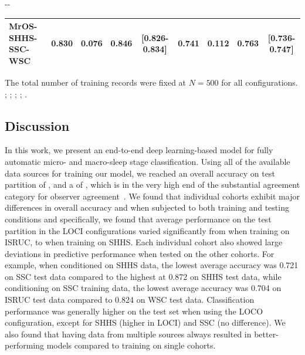 \begin{table}[p]
\begin{adjustwidth*}{}{-\marginparwidth-\marginparsep}
\begin{threeparttable}
\begin{tabular}{@{}lcccccccc@{}}
\acs{MrOS}-\acs{SHHS}-\acs{SSC}-\acs{WSC}         & 0.830         & 0.076       & 0.846           & [0.826-0.834]         & 0.741         & 0.112       & 0.763           & [0.736-0.747]         \\ \bottomrule
\end{tabular}
\begin{tablenotes}
\small \item The total number of training records were fixed at \(N=500\) for all configurations. %
; %
; %
; %
; %
.
\end{tablenotes}
\end{threeparttable}
\end{adjustwidth*}
\end{table}

\subsection{Discussion}
In this work, we present an end-to-end deep learning-based model for fully automatic micro- and macro-sleep stage classification. 
Using all of the available data sources for training our model, we reached an overall accuracy on test partition of , and a \cohen of , which is in the very high end of the substantial agreement category for observer agreement~\cite{Landis1977}.
We found that individual cohorts exhibit major differences in overall accuracy and \cohen when subjected to both training and testing conditions and specifically, we found that average performance on the test partition in the \ac{LOCI} configurations varied significantly from  when training on \ac{ISRUC}, to  when training on \ac{SHHS}.
Each individual cohort also showed large deviations in predictive performance when tested on the other cohorts.
For example, when conditioned on \ac{SHHS} data, the lowest average accuracy was 0.721 on \ac{SSC} test data compared to the highest at 0.872 on \ac{SHHS} test data, while conditioning on \ac{SSC} training data, the lowest average accuracy was 0.704 on \ac{ISRUC} test data compared to 0.824 on \ac{WSC} test data.
Classification performance was generally higher on the test set when using the \ac{LOCO} configuration, except for \ac{SHHS} (higher in \ac{LOCI}) and \ac{SSC} (no difference).
We also found that having data from multiple sources always resulted in better-performing models compared to training on single cohorts.
